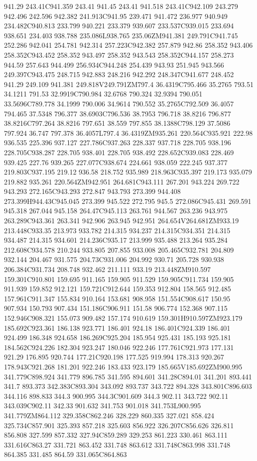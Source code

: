 941.29 243.41C941.359 243.41 941.45 243.41 941.518 243.41C942.109 243.279 942.496 242.596 942.382 241.913C941.95 239.471 941.472 236.977 940.949 234.482C940.813 233.799 940.221 233.379 939.607 233.537C939.015 233.694 938.651 234.403 938.788 235.086L938.765 235.06ZM941.381 249.791C941.745 252.286 942.041 254.781 942.314 257.223C942.382 257.879 942.86 258.352 943.406 258.352C943.452 258.352 943.497 258.352 943.543 258.352C944.157 258.273 944.59 257.643 944.499 256.934C944.248 254.439 943.93 251.945 943.566 249.397C943.475 248.715 942.883 248.216 942.292 248.347C941.677 248.452 941.29 249.109 941.381 249.818V249.791ZM797.4 36.4319C795.466 35.2765 793.51 34.1211 791.53 32.9919C790.984 32.6768 790.324 32.9394 790.051 33.5696C789.778 34.1999 790.006 34.9614 790.552 35.2765C792.509 36.4057 794.465 37.5348 796.377 38.6903C796.536 38.7953 796.718 38.8216 796.877 38.8216C797.264 38.8216 797.651 38.559 797.855 38.1388C798.129 37.5086 797.924 36.747 797.378 36.4057L797.4 36.4319ZM935.261 220.564C935.921 222.98 936.535 225.396 937.127 227.786C937.263 228.337 937.718 228.705 938.196 228.705C938.287 228.705 938.401 228.705 938.492 228.652C939.083 228.469 939.425 227.76 939.265 227.077C938.674 224.661 938.059 222.245 937.377 219.803C937.195 219.12 936.58 218.752 935.989 218.963C935.397 219.173 935.079 219.882 935.261 220.564ZM942.951 264.681C943.111 267.201 943.224 269.722 943.293 272.165C943.293 272.847 943.793 273.399 944.408 273.399H944.43C945.045 273.399 945.522 272.795 945.5 272.086C945.431 269.591 945.318 267.044 945.158 264.47C945.113 263.761 944.567 263.236 943.975 263.289C943.361 263.341 942.906 263.945 942.951 264.654V264.681ZM933.19 213.448C933.35 213.973 933.782 214.315 934.237 214.315C934.351 214.315 934.487 214.315 934.601 214.236C935.17 213.999 935.488 213.264 935.284 212.608C934.578 210.244 933.805 207.855 933.008 205.465C932.781 204.809 932.144 204.467 931.575 204.73C931.006 204.992 930.71 205.728 930.938 206.384C931.734 208.748 932.462 211.111 933.19 213.448ZM910.597 159.301C910.801 159.695 911.165 159.905 911.529 159.905C911.734 159.905 911.939 159.852 912.121 159.721C912.644 159.353 912.804 158.565 912.485 157.961C911.347 155.834 910.164 153.681 908.958 151.554C908.617 150.95 907.934 150.793 907.434 151.186C906.911 151.58 906.774 152.368 907.115 152.946C908.321 155.073 909.482 157.174 910.619 159.301H910.597ZM923.179 185.692C923.361 186.138 923.771 186.401 924.18 186.401C924.339 186.401 924.499 186.348 924.658 186.269C925.204 185.954 925.431 185.193 925.181 184.562C924.226 182.304 923.247 180.046 922.246 177.761C921.973 177.131 921.29 176.895 920.744 177.21C920.198 177.525 919.994 178.313 920.267 178.943C921.268 181.201 922.246 183.433 923.179 185.665V185.692ZM900.995 341.779C898.924 341.779 896.785 341.595 894.601 341.28C894.01 341.201 893.441 341.7 893.373 342.383C893.304 343.092 893.737 343.722 894.328 343.801C896.603 344.116 898.833 344.3 900.995 344.3C901.609 344.3 902.11 343.722 902.11 343.039C902.11 342.33 901.632 341.753 901.018 341.753L900.995 341.779ZM864.112 329.358C862.246 328.229 860.335 327.021 858.424 325.734C857.901 325.393 857.218 325.603 856.922 326.207C856.626 326.811 856.808 327.599 857.332 327.94C859.289 329.253 861.223 330.461 863.111 331.616C863.27 331.721 863.452 331.748 863.612 331.748C863.998 331.748 864.385 331.485 864.59 331.065C864.863 